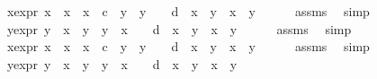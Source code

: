 \begin{isabellebody}
\ x{}{\isacharprime}{\isacharunderscore}expr{\isacharcolon}\ {\isachardoublequoteopen}x{}{\isacharprime}\ {\isacharequal}\ {\isacharparenleft}x{}\ {\isacharasterisk}\ x{}\ {\isacharminus}\ c\ {\isacharasterisk}\ y{}\ {\isacharasterisk}\ y{}{\isacharparenright}\ {\isacharslash}\ {\isacharparenleft}{}\ {\isacharminus}\ d\ {\isacharasterisk}\ x{}\ {\isacharasterisk}\ y{}\ {\isacharasterisk}\ x{}\ {\isacharasterisk}\ y{}{\isacharparenright}{\isachardoublequoteclose}\isanewline
\ \ \ \ \isamarkupfalse%
\ assms{\isacharparenleft}{}{\isacharcomma}{}{\isacharparenright}\ \isamarkupfalse%
\ simp\isanewline
\ \ \isamarkupfalse%
\ y{}{\isacharprime}{\isacharunderscore}expr{\isacharcolon}\ {\isachardoublequoteopen}y{}{\isacharprime}\ {\isacharequal}\ {\isacharparenleft}x{}\ {\isacharasterisk}\ y{}\ {\isacharplus}\ y{}\ {\isacharasterisk}\ x{}{\isacharparenright}\ {\isacharslash}\ {\isacharparenleft}{}\ {\isacharplus}\ d\ {\isacharasterisk}\ x{}\ {\isacharasterisk}\ y{}\ {\isacharasterisk}\ x{}\ {\isacharasterisk}\ y{}{\isacharparenright}{\isachardoublequoteclose}\isanewline
\ \ \ \ \isamarkupfalse%
\ assms{\isacharparenleft}{}{\isacharcomma}{}{\isacharparenright}\ \isamarkupfalse%
\ simp\isanewline
\ \ \isamarkupfalse%
\ x{}{\isacharprime}{\isacharunderscore}expr{\isacharcolon}\ {\isachardoublequoteopen}x{}{\isacharprime}\ {\isacharequal}\ {\isacharparenleft}x{}\ {\isacharasterisk}\ x{}\ {\isacharminus}\ c\ {\isacharasterisk}\ y{}\ {\isacharasterisk}\ y{}{\isacharparenright}\ {\isacharslash}\ {\isacharparenleft}{}\ {\isacharminus}\ d\ {\isacharasterisk}\ x{}\ {\isacharasterisk}\ y{}\ {\isacharasterisk}\ x{}\ {\isacharasterisk}\ y{}{\isacharparenright}{\isachardoublequoteclose}\isanewline
\ \ \ \ \isamarkupfalse%
\ assms{\isacharparenleft}{}{\isacharcomma}{}{\isacharparenright}\ \isamarkupfalse%
\ simp\isanewline
\ \ \isamarkupfalse%
\ y{}{\isacharprime}{\isacharunderscore}expr{\isacharcolon}\ {\isachardoublequoteopen}y{}{\isacharprime}\ {\isacharequal}\ {\isacharparenleft}x{}\ {\isacharasterisk}\ y{}\ {\isacharplus}\ y{}\ {\isacharasterisk}\ x{}{\isacharparenright}\ {\isacharslash}\ {\isacharparenleft}{}\ {\isacharplus}\ d\ {\isacharasterisk}\ x{}\ {\isacharasterisk}\ y{}\ {\isacharasterisk}\ x{}\ {\isacharasterisk}\ y{}{\isacharparenright}{\isachardoublequoteclose}\isanewline

\end{isabellebody}
